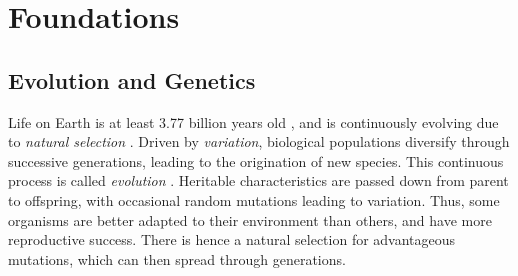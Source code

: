 
\chapter{Foundations}
\label{ch:Foundations}




\section{Evolution and Genetics}
\label{ch:Foundations:sec:EvolutionGenetics}



Life on Earth is at least 3.77 billion years old \cite{Dodd2017},
and is continuously evolving due to \emph{natural selection} \cite{Darwin1859}.
Driven by \emph{variation}, biological populations diversify through successive generations,
leading to the origination of new species.
This continuous process is called \emph{evolution} \cite{Hall2008}.
Heritable characteristics are passed down from parent to offspring,
with occasional random mutations leading to variation.
Thus, some organisms are better adapted to their environment than others,
and have more reproductive success.
There is hence a natural selection for advantageous mutations,
which can then spread through generations.

